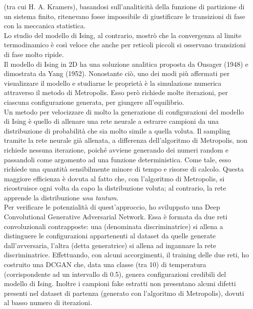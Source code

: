 \documentclass[Lau, noexaminfo, oneside]{sapthesis} %
\begin{document}
(tra cui H. A. Kramers), basandosi sull'analiticità della funzione di partizione di un sistema finito, ritenevano fosse impossibile di giustificare le transizioni di fase con la meccanica statistica. \cite{Kadanoff2009} \\
Lo studio del modello di Ising, al contrario, mostrò che la convergenza al limite termodinamico è così veloce che anche per reticoli piccoli si osservano transizioni di fase molto ripide.\\
Il modello di Ising in 2D ha una soluzione analitica proposta da Onsager (1948) e dimostrata da Yang (1952). Nonostante ciò, uno dei modi più affermati per visualizzare il modello e studiarne le proprietà è la simulazione numerica attraverso il metodo di Metropolis. Esso però richiede molte iterazioni, per ciascuna configurazione generata, per giungere all'equilibrio. \\
Un metodo per velocizzare di molto la generazione di configurazioni del modello di Ising è quello di allenare una rete neurale a estrarre campioni da una distribuzione di probabilità che sia molto simile a quella voluta. Il sampling tramite la rete neurale già allenata, a differenza dell'algoritmo di Metropolis, non richiede nessuna iterazione, poiché avviene generando dei numeri random e passandoli come argomento ad una funzione deterministica. Come tale, esso richiede una quantità sensibilmente minore di tempo e risorse di calcolo. Questa maggiore efficienza è dovuta al fatto che, con l'algoritmo di Metropolis, si ricostruisce ogni volta da capo la distribuzione voluta; al contrario, la rete apprende la distribuzione \textit{una tantum}. \\
Per verificare le potenzialità di quest'approccio, ho sviluppato una  Deep Convolutional Generative Adversarial Network. Essa è formata da due reti convoluzionali contrapposte: una (denominata discriminatrice) si allena a distinguere le configurazioni appartenenti al dataset da quelle generate dall'avversaria, l'altra (detta generatrice) si allena ad ingannare la rete discriminatrice. Effettuando, con alcuni accorgimenti, il training delle due reti, ho costruito una DCGAN che, data una classe (tra 10) di temperatura (corrispondente ad un intervallo di 0.5), genera configurazioni credibili del modello di Ising. Inoltre i campioni fake estratti non presentano alcuni difetti presenti nel dataset di partenza (generato con l'algoritmo di Metropolis), dovuti al basso numero di iterazioni.
\end{document}
